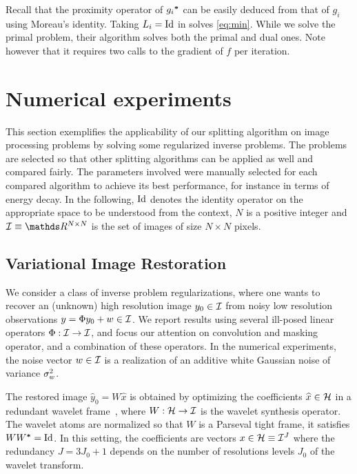 \noindent Recall that the proximity operator of ${g_i}^{\boldsymbol*}$ can be easily deduced from that of $g_i$ using Moreau's identity. Taking $L_i=\operatorname{Id}$ in  solves \eqref{eq:min}. While we solve the primal problem, their algorithm solves both the primal and dual ones. Note however that it requires two calls to the gradient of $f$ per iteration.

\section{Numerical experiments}
\label{sec:numeric}

This section exemplifies the applicability of our \GFB splitting algorithm on image processing problems by solving some regularized inverse problems. The problems are selected so that other splitting algorithms can be applied as well and compared fairly. The parameters involved were manually selected for each compared algorithm to achieve its best performance, for instance in terms of energy decay. In the following, $\operatorname{Id}$ denotes the identity operator on the appropriate space to be understood from the context, $N$ is a positive integer and $\RNN \equiv \R^{N \times N}$ is the set of images of size $N \times N$ pixels.

\subsection{Variational Image Restoration}

We consider a class of inverse problem regularizations, where one wants to recover an (unknown) high resolution image $y_0 \in \mathcal{I}$ from noisy low resolution observations $y = \Phi y_0 + w \in \mathcal{I}$. We report results using several ill-posed linear operators $\Phi : \mathcal{I} \to \mathcal{I}$, and focus our attention on convolution and masking operator, and a combination of these operators. In the numerical experiments, the noise vector $w \in \mathcal{I}$ is a realization of an additive white Gaussian noise of variance $\sigma_w^2$.

The restored image $\widehat{y}_0=W\widehat{x}$ is obtained by optimizing the coefficients $\widehat{x} \in \mathcal{H}$ in a redundant wavelet frame~\cite{Mallat99}, where $W : \mathcal{H} \to \mathcal{I}$ is the wavelet synthesis operator. The wavelet atoms are normalized so that $W$ is a Parseval tight frame, \ie it satisfies $W{W}^{\boldsymbol*} = \operatorname{Id}$. In this setting, the coefficients are vectors $x \in \mathcal{H}\equiv \mathcal{I}^J$ where the redundancy $J=3 J_0 + 1$ depends on the number of resolutions levels $J_0$ of the wavelet transform.

